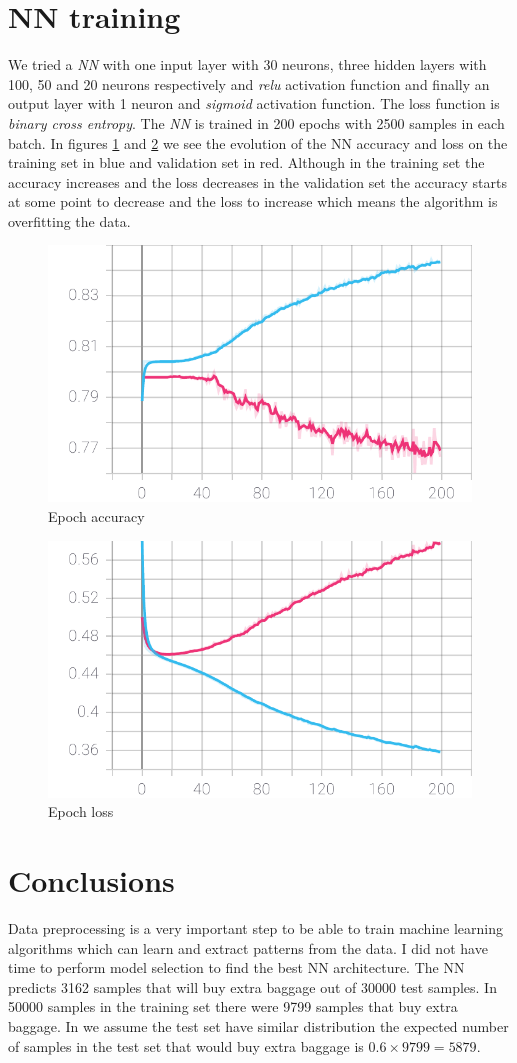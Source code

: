 \documentclass[11pt,amsmath,amssymb]{article}
\begin{document}
\section{NN training}
We tried a \textit{NN} with one input layer with 30 neurons, three hidden layers with 100, 50 and 20 neurons respectively and \textit{relu} activation function and finally an output layer with 1 neuron and \textit{sigmoid} activation function. The loss function is \textit{binary cross entropy}. The \textit{NN} is trained in 200 epochs with 2500 samples in each batch. In figures \ref{fig:accuracy} and \ref{fig:loss} we see the evolution of the NN accuracy and loss on the training set in blue and validation set in red. Although in the training set the accuracy increases and the loss decreases in the validation set the accuracy starts at some point to decrease and the loss to increase which means the algorithm is overfitting the data.
\begin{figure}
	\centering
	\includegraphics[width=0.8\columnwidth]{epoch_accuracy.pdf}
	\caption{Epoch accuracy}
	\label{fig:accuracy}
\end{figure}
\begin{figure}
	\centering
	\includegraphics[width=0.8\columnwidth]{epoch_loss.pdf}
	\caption{Epoch loss}
	\label{fig:loss}
\end{figure}
\section{Conclusions}
Data preprocessing is a very important step to be able to train machine learning algorithms which can learn and extract patterns from the data. I did not have time to perform model selection to find the best NN architecture. The NN predicts 3162 samples that will buy extra baggage out of 30000 test samples. In 50000 samples in the training set there were 9799 samples that buy extra baggage. In we assume the test set have similar distribution the expected number of samples in the test set that would buy extra baggage is \(0.6\times 9799 = 5879 \). 
\end{document}
